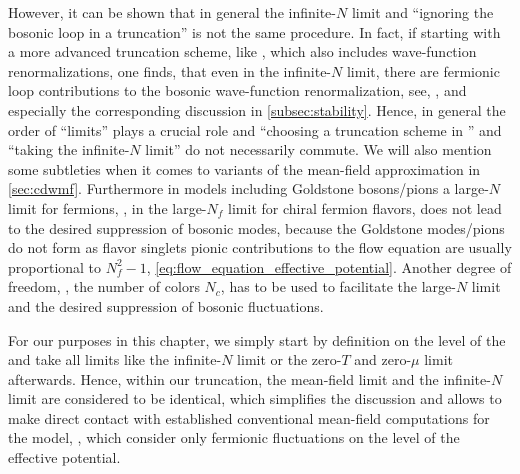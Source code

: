 However, it can be shown that in general the infinite-$N$ limit and ``ignoring the bosonic loop in a \lpa{} truncation'' is not the same procedure. 
In fact, if starting with a more advanced \frg{} truncation scheme, like \lpap{}, which also includes wave-function renormalizations, one finds, that even in the infinite-$N$ limit, there are fermionic loop contributions to the bosonic wave-function renormalization, see, \eg{},  and especially the corresponding discussion in \cref{subsec:stability}.
Hence, in general the order of ``limits'' plays a crucial role and ``choosing a truncation scheme in \frg{}'' and ``taking the infinite-$N$ limit'' do not necessarily commute.
We will also mention some subtleties when it comes to variants of the mean-field approximation in \cref{sec:cdwmf}.
Furthermore in models including Goldstone bosons/pions a large-$N$ limit for fermions, \eg{}, in the large-$N_f$ limit for chiral fermion flavors, does not lead to the desired suppression of bosonic modes{}, because the Goldstone modes{}/pions do not form as flavor singlets \dash{} pionic contributions to the \lpa{} flow equation are usually proportional to $N_f^2-1$, \cf{} \cref{eq:flow_equation_effective_potential}.
Another degree of freedom, \eg{}, the number of colors $N_c$, has to be used to facilitate the large-$N$ limit and the desired suppression of bosonic fluctuations.
	
For our purposes in this chapter, we simply start by definition on the level of the \lpa{} and take all limits like the infinite-$N$ limit or the zero-$T$ and zero-$\mu$ limit afterwards.
Hence, within our truncation, the mean-field limit and the infinite-$N$ limit are considered to be identical, which simplifies the discussion and allows to make direct contact with established conventional mean-field computations for the \gn{} model, \cf{} , which consider only fermionic fluctuations on the level of the effective potential.\bigskip
	
